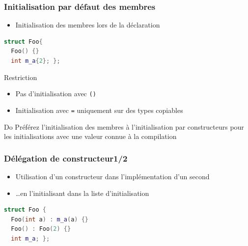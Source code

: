 \documentclass[C++.tex]{subfiles}
\begin{document}
\begin{frame}[fragile]
	\frametitle{Initialisation par défaut des membres}
	\begin{itemize}
		\item Initialisation des membres lors de la déclaration
	\end{itemize}

	\begin{lstlisting}[language=C++]
struct Foo{
  Foo() {}
  int m_a{2}; };\end{lstlisting}

	\begin{alertblock}{Restriction}
		\begin{itemize}
			\item Pas d'initialisation avec \lstinline|()|
			\item Initialisation avec \lstinline|=| uniquement sur des types copiables
		\end{itemize}
	\end{alertblock}

	\begin{exampleblock}{Do}
		Préférez l'initialisation des membres à l'initialisation par constructeurs pour les initialisations avec une valeur connue à la compilation

	\end{exampleblock}
\end{frame}

\begin{frame}[fragile]
	\frametitle{Délégation de constructeur\titlehfill{}1/2}
	\begin{itemize}
		\item Utilisation d'un constructeur dans l'implémentation d'un second
		\item \ldots{}en \og l'initialisant\fg{} dans la liste d'initialisation
	\end{itemize}

	\begin{lstlisting}[language=C++]
struct Foo {
  Foo(int a) : m_a(a) {}
  Foo() : Foo(2) {}
  int m_a; };\end{lstlisting}
\end{frame}
\end{document}
